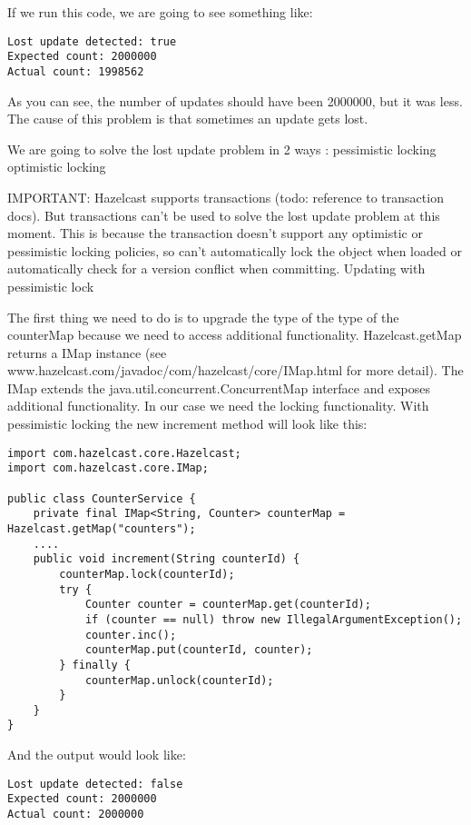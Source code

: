 If we run this code, we are going to see something like:

\begin{verbatim}
Lost update detected: true
Expected count: 2000000
Actual count: 1998562
\end{verbatim}

As you can see, the number of updates should have been 2000000, but it was less. The cause of this problem is that sometimes an update gets lost.

We are going to solve the lost update problem in 2 ways :
pessimistic locking
optimistic locking

IMPORTANT: Hazelcast supports transactions (todo: reference to transaction docs). But transactions can't be used to solve the lost update problem at this moment. This is because the transaction doesn't support any optimistic or pessimistic locking policies, so can't automatically lock the object when loaded or automatically check for a version conflict when committing.
Updating with pessimistic lock

The first thing we need to do is to upgrade the type of the type of the counterMap because we need to access additional functionality. Hazelcast.getMap returns a IMap instance (see www.hazelcast.com/javadoc/com/hazelcast/core/IMap.html for more detail). The IMap extends the java.util.concurrent.ConcurrentMap interface and exposes additional functionality. In our case we need the locking functionality. With pessimistic locking the new increment method will look like this:

\begin{verbatim}
import com.hazelcast.core.Hazelcast;
import com.hazelcast.core.IMap;

public class CounterService {
    private final IMap<String, Counter> counterMap = Hazelcast.getMap("counters");
    ....
    public void increment(String counterId) {
        counterMap.lock(counterId);
        try {
            Counter counter = counterMap.get(counterId);
            if (counter == null) throw new IllegalArgumentException();
            counter.inc();
            counterMap.put(counterId, counter);
        } finally {
            counterMap.unlock(counterId);
        }
    }
}
\end{verbatim}

And the output would look like:

\begin{verbatim}
Lost update detected: false
Expected count: 2000000
Actual count: 2000000
\end{verbatim}

